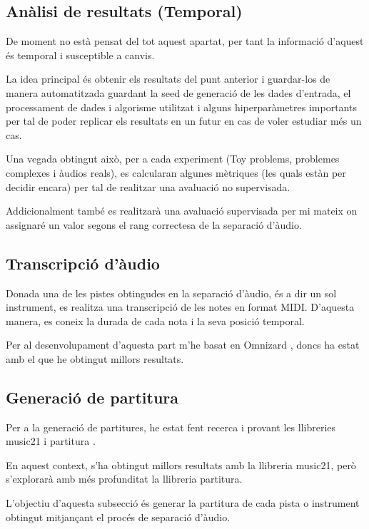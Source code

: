 \documentclass[10pt,a4paper,twocolumn,twoside]{article}
\begin{document}
\subsection{Anàlisi de resultats (Temporal)}

De moment no està pensat del tot aquest apartat, per tant la informació d'aquest és temporal i susceptible a canvis.

La idea principal és obtenir els resultats del punt anterior i guardar-los de manera automatitzada guardant la seed de generació de les dades d'entrada, el processament de dades i algorisme utilitzat i alguns hiperparàmetres importants per tal de poder replicar els resultats en un futur en cas de voler estudiar més un cas.

Una vegada obtingut això, per a cada experiment (Toy problems, problemes complexes i àudios reals), es calcularan algunes mètriques (les quals estàn per decidir encara) per tal de realitzar una avaluació no supervisada.

Addicionalment també es realitzarà una avaluació supervisada per mi mateix on assignaré un valor segons el rang correctesa de la separació d'àudio.

\subsection{Transcripció d'àudio}

Donada una de les pistes obtingudes en la separació d'àudio, és a dir un sol instrument, es realitza una transcripció de les notes en format MIDI. D'aquesta manera, es coneix la durada de cada nota i la seva posició temporal. \cite{music-transcription-app132111882} 

Per al desenvolupament d'aquesta part m'he basat en Omnizard \cite{Omnizard-Wu2021}, doncs ha estat amb el que he obtingut millors resultats.


\subsection{Generació de partitura}

Per a la generació de partitures, he estat fent recerca i provant les llibreries music21 \cite{music21-conf/ismir/CuthbertA10} i partitura \cite{partitura_mec}.

En aquest context, s'ha obtingut millors resultats amb la llibreria music21, però s'explorarà amb més profunditat la llibreria partitura.

L'objectiu d'aquesta subsecció és generar la partitura de cada pista o instrument obtingut mitjançant el procés de separació d'àudio.
\end{document}
